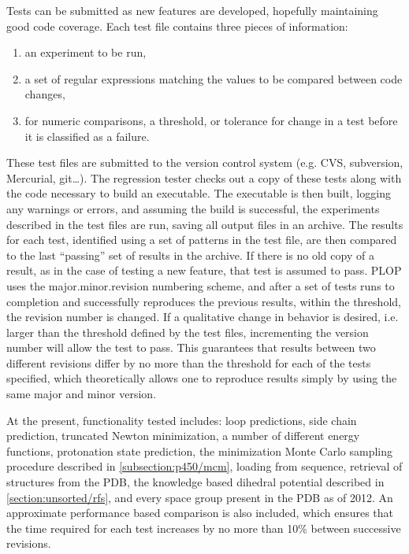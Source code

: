Tests can be submitted as new features are developed, hopefully maintaining good code coverage.
Each test file contains three pieces of information:
\begin{enumerate}
\item an experiment to be run,
\item a set of regular expressions matching the values to be compared between code changes,
\item for numeric comparisons, a threshold, or tolerance for change in a test before it is classified as a failure.
\end{enumerate}
These test files are submitted to the version control system (e.g. CVS, subversion, Mercurial, git\ldots).
The regression tester checks out a copy of these tests along with the code necessary to build an executable.
The executable is then built, logging any warnings or errors, and assuming the build is successful, the experiments described in the test files are run, saving all output files in an archive.
The results for each test, identified using a set of patterns in the test file, are then compared to the last ``passing'' set of results in the archive.
If there is no old copy of a result, as in the case of testing a new feature, that test is assumed to pass.
PLOP uses the major.minor.revision numbering scheme, and after a set of tests runs to completion and successfully reproduces the previous results, within the threshold, the revision number is changed.
If a qualitative change in behavior is desired, i.e. larger than the threshold defined by the test files, incrementing the version number will allow the test to pass.
This guarantees that results between two different revisions differ by no more than the threshold for each of the tests specified, which theoretically allows one to reproduce results simply by using the same major and minor version.

At the present, functionality tested includes: loop predictions, side chain prediction, truncated Newton minimization, a number of different energy functions, protonation state prediction, the minimization Monte Carlo sampling procedure described in \ref{subsection:p450/mcm}, loading from sequence, retrieval of structures from the PDB, the knowledge based dihedral potential described in \ref{section:unsorted/rfs}, and every space group present in the PDB as of 2012.
An approximate performance based comparison is also included, which ensures that the time required for each test increases by no more than 10\% between successive revisions.

